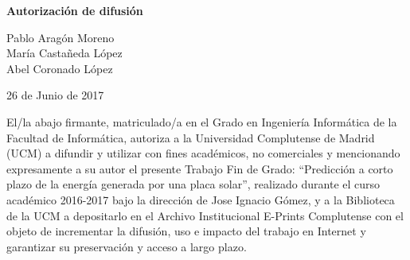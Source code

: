 
\newpage

\thispagestyle{empty}

\begin{center}

{\bf \Huge Autorización de difusión}

\vspace{1cm}

    {\large Pablo Aragón Moreno}\\
    {\large María Castañeda López}\\
    {\large Abel Coronado López}\\

   \vspace{0.5cm}


   26 de Junio de 2017\\
   \vspace{0.5cm}

\end{center}
   
El/la abajo firmante, matriculado/a en el Grado en Ingeniería Informática de la Facultad de Informática, autoriza a la Universidad Complutense de Madrid (UCM) a difundir y utilizar con fines académicos, no comerciales y mencionando expresamente a su autor el presente Trabajo Fin de Grado: “Predicción a corto plazo de la energía
   	 generada por una placa solar”, realizado durante el curso académico 2016-2017 bajo la dirección de Jose Ignacio Gómez, y a la Biblioteca de la UCM a depositarlo en el Archivo Institucional E-Prints Complutense con el objeto de incrementar la difusión, uso e impacto del trabajo en Internet y garantizar su preservación y acceso a largo plazo.

